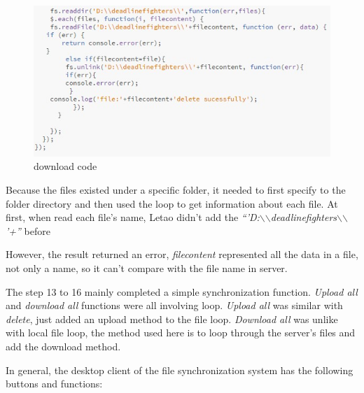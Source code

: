 \documentclass[a4paper]{article}
\begin{document}
\begin{flushleft}
\begin{figure}[h!]
\centering
\includegraphics[scale=1.2]{code3}
\caption{download code}
\label{fig:code3}
\end{figure}

Because the files existed under a specific folder, it needed to first specify to the folder directory and then used the loop to get information about each file. At first, when read each file’s name, Letao didn’t add the \emph{“'D:$\backslash$$\backslash$deadlinefighters$\backslash$$\backslash$'+”} before\newline

However, the result returned an error, \emph{filecontent} represented all the data in a file, not only a name, so it can’t compare with the file name in server.\newline

The step 13 to 16 mainly completed a simple synchronization function. \emph{Upload all} and \emph{download all} functions were all involving loop. \emph{Upload all} was similar with \emph{delete}, just added an upload method to the file loop. \emph{Download all} was unlike with local file loop, the method used here is to loop through the server's files and add the download method.\newline

In general, the desktop client of the file synchronization system has the following buttons and functions:\newline



\end{flushleft}
\end{document}
